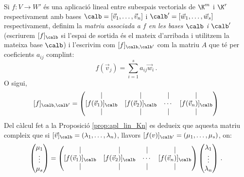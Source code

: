 \begin{definicio}\label{def:matriu_apl_lineal}
	Si $f\colon V \to W'$ és una aplicació lineal entre subespais vectorials de $\K^m$ i $\K^r$ respectivament amb bases $\calb=[\vec v_1, \dots, \vec v_n]$ i $\calb'=[\vec w_1, \dots, \vec w_s]$ respectivament, definim la \emph{matriu associada a $f$ en les bases $\calb$ i $\calb'$} (escriurem $[f]_\calb$ si l'espai de sortida és el mateix d'arribada i utilitzem la mateixa base $\calb$) i l'escrivim com $[f]_{\calb,\calb'}$ com la matriu $A$ que té per coeficients $a_{ij}$ complint:
	$$
	f(\vec v_j)=\sum_{i=1}^s a_{ij} \vec w_i \,.
	$$
	O sigui,
	$$
	[f]_{\calb,\calb'}=\begin{pmatrix}
	\mid & \mid &\mid & \mid\\
	[f(\vec v_1)]_\calb & [f(\vec v_2)]_\calb &\cdots&[f(\vec v_n)]_\calb\\
	\mid & \mid &\mid & \mid
	\end{pmatrix}
	$$
	Del càlcul fet a la Proposició \ref{prop:apl_lin_Kn} es dedueix que aquesta matriu compleix que si $[\vec v]_\calb=(\lambda_1,\dots,\lambda_n)$, llavors $[f(v)]_{\calb'}=(\mu_1,\dots,\mu_s)$, on:
	\begin{equation}\label{eq:matriu_apl_lineal}
	\begin{pmatrix}
	\mu_1 \\ \vdots \\ \mu_s
	\end{pmatrix}=
	\begin{pmatrix}
	\mid & \mid &\mid & \mid\\
	[f(\vec v_1)]_\calb & [f(\vec v_2)]_\calb &\cdots&[f(\vec v_n)]_\calb\\
	\mid & \mid &\mid & \mid
	\end{pmatrix}
	\begin{pmatrix}
	\lambda_1 \\ \vdots \\ \lambda_n
	\end{pmatrix} \,.
	\end{equation}
\end{definicio}

